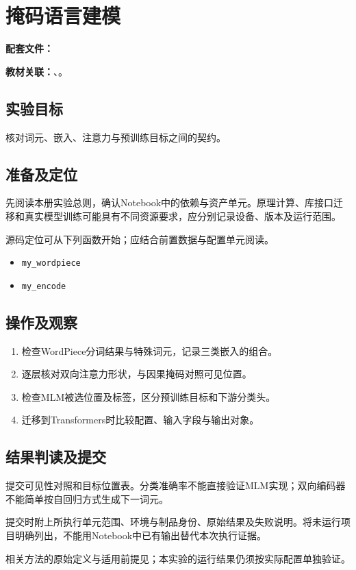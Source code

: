 \chapter{掩码语言建模}
\label{lab:E30_nlp_bert}

\noindent\textbf{配套文件：}\par
\noindent\textbf{教材关联：}、。

\section*{实验目标}
核对词元、嵌入、注意力与预训练目标之间的契约。

\section*{准备及定位}
先阅读本册实验总则，确认Notebook中的依赖与资产单元。原理计算、库接口迁移和真实模型训练可能具有不同资源要求，应分别记录设备、版本及运行范围。

源码定位可从下列函数开始；应结合前置数据与配置单元阅读。
\begin{itemize}
\item \texttt{my\_wordpiece}
\item \texttt{my\_encode}
\end{itemize}

\section*{操作及观察}
\begin{enumerate}
\item 检查WordPiece分词结果与特殊词元，记录三类嵌入的组合。
\item 逐层核对双向注意力形状，与因果掩码对照可见位置。
\item 检查MLM被选位置及标签，区分预训练目标和下游分类头。
\item 迁移到Transformers时比较配置、输入字段与输出对象。
\end{enumerate}

\section*{结果判读及提交}
提交可见性对照和目标位置表。分类准确率不能直接验证MLM实现；双向编码器不能简单按自回归方式生成下一词元。

提交时附上所执行单元范围、环境与制品身份、原始结果及失败说明。将未运行项目明确列出，不能用Notebook中已有输出替代本次执行证据。

相关方法的原始定义与适用前提见\cite{devlinBERTPretrainingDeep2019}；本实验的运行结果仍须按实际配置单独验证。
